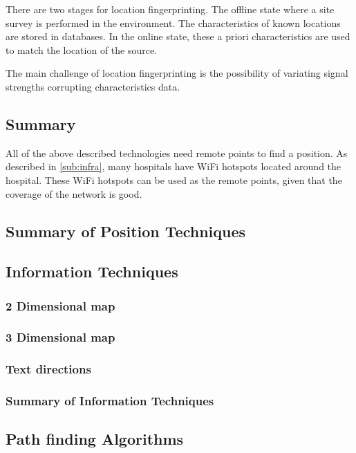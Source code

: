   There are two stages for location fingerprinting. The offline state where a site survey is performed in the environment. The characteristics of known locations are stored in databases. In the online state, these a priori characteristics are used to match the location of the source.

  The main challenge of location fingerprinting is the possibility of variating signal strengths corrupting characteristics data.

  \subsection{Summary}


  All of the above described technologies need remote points to find a position. As described in \cref{sub:infra}, many hospitals have WiFi hotspots located around the hospital. These WiFi hotspots can be used as the remote points, given that the coverage of the network is good.

  \subsection{Summary of Position Techniques}

  \subsection{Information Techniques}

  \subsubsection{2 Dimensional map}

  \subsubsection{3 Dimensional map}

  \subsubsection{Text directions}

  \subsubsection{Summary of Information Techniques}

\newpage

\subsection{Path finding Algorithms}


